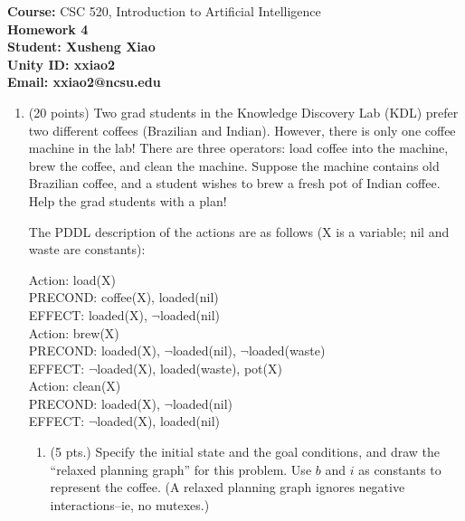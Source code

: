 \documentclass{article}%
\begin{document}
\begin{flushleft}
\textbf{Course:} CSC 520, Introduction to Artificial Intelligence\\
\textbf{Homework 4}\\
\textbf{Student: Xusheng Xiao} \\
\textbf{Unity ID: xxiao2} \\
\textbf{Email: xxiao2@ncsu.edu}
\end{flushleft}

\noindent{\hrulefill}

\bigskip

\begin{enumerate}
  \item (20 points) Two grad students in the Knowledge Discovery Lab (KDL) prefer two different coffees (Brazilian and Indian). However, there is only one coffee machine in the lab! There are three operators: load coffee into the machine, brew the coffee, and clean the machine. Suppose the machine contains old Brazilian coffee, and a student wishes to brew a fresh pot of Indian coffee. Help the grad students with a plan!
  
The PDDL description of the actions are as follows (X is a variable; nil and waste are constants):

Action: load(X)	 \\
\hspace*{6ex} 	PRECOND: coffee(X), loaded(nil) \\
\hspace*{6ex} 	EFFECT: loaded(X), $\neg$loaded(nil)\\
Action: brew(X)	 \\
\hspace*{6ex} 	PRECOND: loaded(X), $\neg$loaded(nil), $\neg$loaded(waste)\\
\hspace*{6ex} 	EFFECT: $\neg$loaded(X), loaded(waste), pot(X)\\
Action: clean(X)	 \\
\hspace*{6ex} 	PRECOND: loaded(X), $\neg$loaded(nil)\\
\hspace*{6ex} 	EFFECT: $\neg$loaded(X), loaded(nil)\\
 	
\begin{enumerate}
  \item (5 pts.) Specify the initial state and the goal conditions, and draw the ``relaxed planning graph'' for this problem. Use $b$ and $i$ as constants to represent the coffee. (A relaxed planning graph ignores negative interactions--ie, no mutexes.)\\
  

\end{enumerate}
\end{enumerate}
\end{document}
